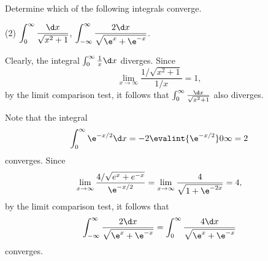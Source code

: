 \begin{problem}
    Determine which of the following integrals converge.

    \begin{tasks}(2)
        \task $\displaystyle\int_0^\infty \frac{\d x}{\sqrt{x^2 + 1}}$,
        \task $\displaystyle\int_{-\infty}^\infty \frac{2 \d x}{\sqrt{\e^x + \e^{-x}}}$.
    \end{tasks}
\end{problem}
\begin{solution}
    \begin{ppart}
        Clearly, the integral $\int_0^\infty \frac1x \d x$ diverges. Since \[\lim_{x \to \infty} \frac{1/\sqrt{x^2 + 1}}{1/x} = 1,\] by the limit comparison test, it follows that $\int_0^\infty \frac{\d x}{\sqrt{x^2 + 1}}$ also diverges.
    \end{ppart}
    \begin{ppart}
        Note that the integral \[\int_0^\infty \e^{-x/2} \d x = -2 \evalint{\e^{-x/2}}0\infty = 2\] converges. Since \[\lim_{x \to \infty} \frac{4 / \sqrt{e^x + e^{-x}}}{\e^{-x/2}} = \lim_{x \to \infty} \frac{4}{\sqrt{1 + \e^{-2x}}} = 4,\] by the limit comparison test, it follows that \[\int_{-\infty}^\infty \frac{2 \d x}{\sqrt{\e^x + \e^{-x}}} = \int_0^\infty \frac{4 \d x}{\sqrt{\e^x + \e^{-x}}}\] converges.
    \end{ppart}
\end{solution}